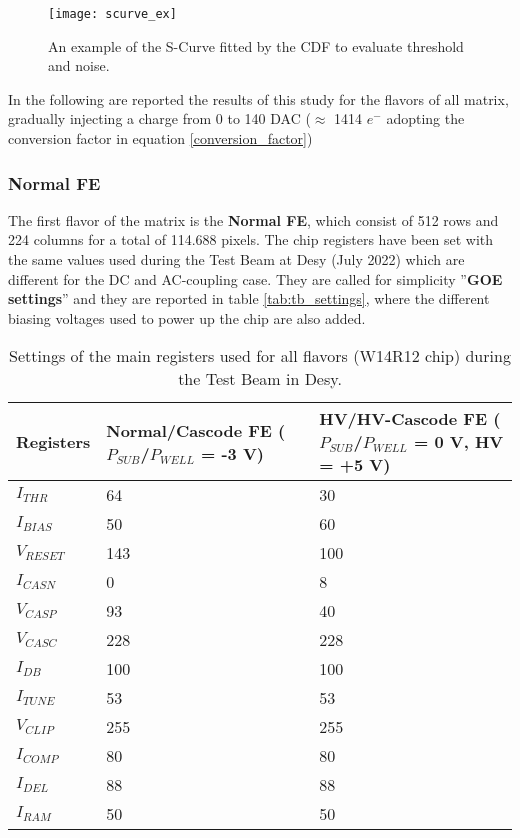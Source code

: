 \begin{comment}
 plotting the number of hits observed on each pixel divided by the total number of injections, for each injected charge,
\end{comment}



\begin{figure}
\centering
\texttt{[image: scurve\_ex]}
\caption{An example of the S-Curve fitted by the CDF to evaluate threshold and noise.}
\label{ex_scurve}
\end{figure}

In the following are reported the results of this study for the flavors of all matrix, gradually injecting a charge from 0 to 140 DAC ($\approx$ 1414 $e^{-}$ adopting the conversion factor in equation \ref{conversion_factor})



\subsubsection{Normal FE}


The first flavor of the matrix is the \textbf{Normal FE}, which consist of 512 rows and 224 columns for a total of 114.688 pixels. The chip registers have been set with the same values used during the Test Beam at Desy (July 2022) which are different for the DC and AC-coupling case. They are called for simplicity ''\textbf{GOE settings}'' and they are reported in table \vref{tab:tb_settings}, where the different biasing voltages used to power up the chip are also added.

\begin{table}[h!]
\centering
\begin{tabular}{>{} C{3.2cm}|C{3.7cm}|C{3.5cm}}
Registers & Normal/Cascode FE ($P_{SUB}$/$P_{WELL}$ = -3 V) & HV/HV-Cascode FE ($P_{SUB}$/$P_{WELL}$ = 0 V, HV = +5 V)\\[2ex]
\hline
$I_{THR}$ & 64 & 30\\[0.5ex]
\hline
$I_{BIAS}$ & 50 & 60\\
\hline
$V_{RESET}$ & 143 & 100\\
\hline
$I_{CASN}$ & 0 & 8\\
\hline
$V_{CASP}$ & 93 &40\\
\hline
$V_{CASC}$ & 228 & 228\\
\hline
$I_{DB}$ & 100 & 100\\
\hline
$I_{TUNE}$ & 53 & 53\\
\hline
$V_{CLIP}$ & 255 &255\\
\hline
$I_{COMP}$ & 80 & 80\\
\hline
$I_{DEL}$ & 88 & 88\\
\hline
$I_{RAM}$ & 50 & 50\\
\hline
\end{tabular}
\caption{Settings of the main registers used for all flavors (W14R12 chip) during the Test Beam in Desy.}
\label{tab:tb_settings}
\end{table}


